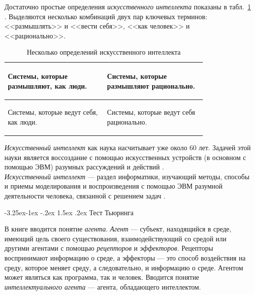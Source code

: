 \documentclass[12pt, openany, twoside]{book} %
\makeatletter
\renewcommand\subsection{\@startsection{subsection}{2}{\z@}%
                                     {-3.25ex\@plus -1ex \@minus -.2ex}%
                                     {1.5ex \@plus .2ex}%
                                     {\normalfont\normalsize\bfseries}}
\makeatother
\begin{document}
Достаточно простые определения {\em искусственного интеллекта} показаны в табл.~\ref{pic:determai} \cite{Russell}. Выделяются несколько комбинаций двух пар ключевых терминов: <<размышлять>> и <<вести себя>>, <<как человек>> и <<рационально>>.

\begin{table}[h]
\caption{Несколько определений искусственного интеллекта} \label{pic:determai}
\begin{center}
\begin{tabular}{|p{0.4\linewidth}|p{0.4\linewidth}|}
 \hline
 \begin{raggedright}
   Системы, которые размышляют, как люди.
 \end{raggedright}
 &
 \begin{raggedright}
   Системы, которые размышляют рационально.
 \end{raggedright}
 \\\hline
 \begin{raggedright}
   Системы, которые ведут себя, как
   люди.
 \end{raggedright}
 &
 \begin{raggedright}
   Системы, которые ведут себя рационально.
 \end{raggedright}
   \\\hline
\end{tabular}
\end{center}
\end{table}

{\em Искусственный интеллект} как наука насчитывает уже около 60 лет. Задачей этой науки является воссоздание с помощью искусственных устройств (в основном с помощью ЭВМ) разумных рассуждений и действий \cite{Lauriere}.\\
{\em Искусственный интеллект} --- раздел информатики, изучающий методы, способы и приемы моделирования и воспроизведения с помощью ЭВМ разумной деятельности человека, связанной с решением задач \cite{math_slov:88}.

\subsection{Тест Тьюринга}

В книге \cite{Russell} вводится понятие {\em агента}. {\em Агент} --- субъект, находящийся в среде, имеющий цель своего существования, взаимодействующий со средой или другими агентами с помощью {\em рецепторов} и {\em эффекторов}. Рецепторы воспринимают информацию о среде, а эффекторы --- это способ воздействия на среду, которое меняет среду, а следовательно, и информацию о среде. Агентом может являться как программа, так и человек. Вводится понятие {\em интеллектуального агента} --- агента, обладающего интеллектом.
\end{document}
